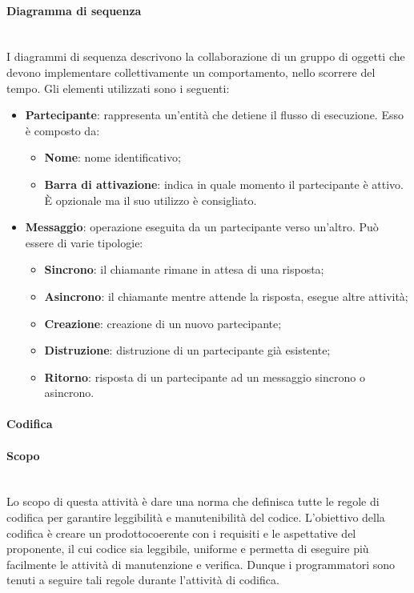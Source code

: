 			\paragraph*{Diagramma di sequenza}\mbox{}\\ [1mm]
			I diagrammi di sequenza descrivono la collaborazione di un gruppo di oggetti che devono implementare collettivamente un comportamento, nello scorrere del tempo. Gli elementi utilizzati sono i seguenti:
			\begin{itemize}
				\item \textbf{Partecipante}: rappresenta un'entità che detiene il flusso di esecuzione. Esso è composto da:
					\begin{itemize}
						\item \textbf{Nome}: nome identificativo;
						\item \textbf{Barra di attivazione}: indica in quale momento il partecipante è attivo. È opzionale ma il suo utilizzo è consigliato.
					\end{itemize}
				\item \textbf{Messaggio}: operazione eseguita da un partecipante verso un'altro. Può essere di varie tipologie:
					\begin{itemize}
						\item \textbf{Sincrono}: il chiamante rimane in attesa di una risposta;
						\item \textbf{Asincrono}: il chiamante mentre attende la risposta, esegue altre attività;
						\item \textbf{Creazione}: creazione di un nuovo partecipante;
						\item \textbf{Distruzione}: distruzione di un partecipante già esistente;
						\item \textbf{Ritorno}: risposta di un partecipante ad un messaggio sincrono o asincrono.
					\end{itemize}
			\end{itemize}
			\paragraph{Codifica}
			\paragraph*{Scopo}\mbox{}\\ [1mm]
			Lo scopo di questa attività è dare una norma che definisca tutte le regole di codifica per garantire leggibilità e manutenibilità del codice.
			L'obiettivo della codifica è creare un prodotto\glosp coerente con i requisiti e le aspettative del proponente, il cui codice sia leggibile, uniforme e permetta di eseguire più facilmente le attività di manutenzione e verifica. Dunque i programmatori sono tenuti a seguire tali regole durante l'attività di codifica.
